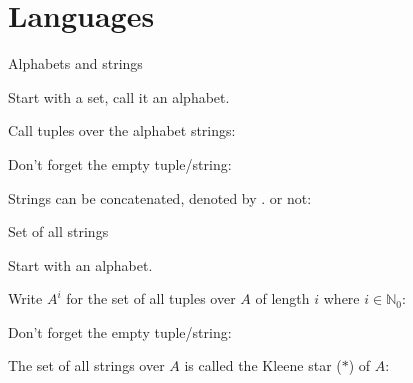 \documentclass{beamer}
\begin{document}
\section{Languages}

\begin{frame}{Alphabets and strings}

  \vspace{2mm}

  Start with a set, call it an alphabet.


  \vspace{2mm}

  Call tuples over the alphabet strings:


  \vspace{2mm}

  Don't forget the empty tuple/string:

  \redmath{\epsilon = ()}

  \vspace{2mm}

  Strings can be concatenated, denoted by $.$ or not:



\end{frame}


\begin{frame}{Set of all strings}

  \vspace{2mm}

  Start with an alphabet.


  \vspace{2mm}

  Write $A^i$ for the set of all tuples over $A$ of length $i$ where $i \in \mathbb{N}_0$:


  \vspace{2mm}

  Don't forget the empty tuple/string:


  \vspace{2mm}

  The set of all strings over $A$ is called the \textcolor{gmitblue}{Kleene star ($*$)} of $A$:


\end{frame}
\end{document}
